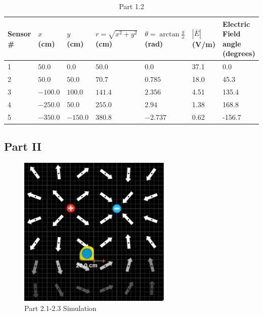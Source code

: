 \documentclass{article}
\begin{document}
\begin{table}[htpb]
	\centering
	\caption{Part 1.2}
	\label{tab:label}
	\begin{tabular}{| l | l | l | l | l | l | l |}
	\hline
	\tiny Sensor \# & \tiny $x$ (cm) & \tiny$y$ (cm) & \tiny$r = \sqrt{x^2+y^2} $ (cm) & \tiny$\theta = \arctan \frac{y}{x}$ (rad) & \tiny$\left| \overline{E} \right| $ (V/m) & \tiny Electric Field angle (degrees)\\
	\hline
	1  & $50.0$ & $0.0$ & $50.0$ & 0.0 & 37.1 & 0.0\\
	\hline
	2  & $50.0$ & $50.0$ & $70.7$& $0.785$ & 18.0 & 45.3\\
	\hline
	3  & $-100.0$ & $100.0$ & $141.4$ & $2.356$ & 4.51 & 135.4\\
	\hline
	4  & $-250.0$ & $ 50.0$ & $255.0$ & $2.94$ & 1.38 & 168.8\\
	\hline
	5  & $-350.0$ &  $-150.0$ & $380.8$ & $-2.737$ & 0.62 & -156.7\\
	\hline
	\end{tabular}
\end{table}

\subsection{Part II}%
\label{sub:part_two}

\begin{figure}[H]
	\begin{center}
		\includegraphics[width=0.65\textwidth]{simulation-1.2} %
		\caption{Part 2.1-2.3 Simulation}
	\end{center}
\end{figure}
\end{document}

